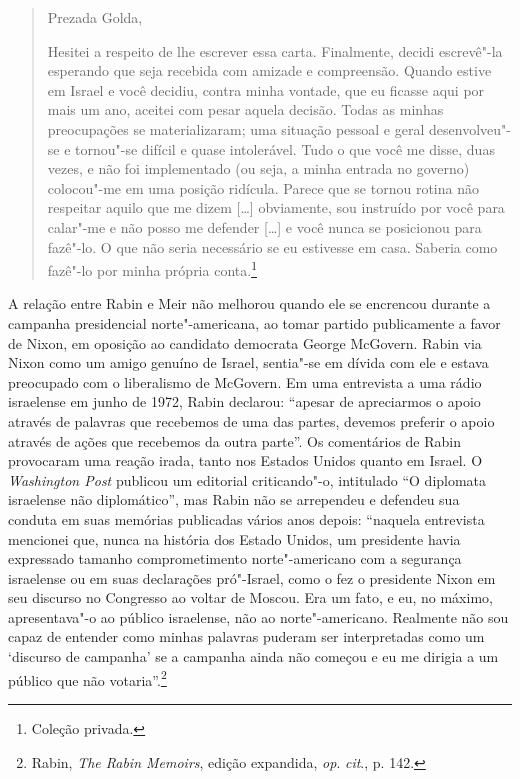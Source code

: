 \begin{quote}
Prezada Golda,

Hesitei a respeito de lhe escrever essa carta. Finalmente, decidi
escrevê"-la esperando que seja recebida com amizade e compreensão. Quando
estive em Israel e você decidiu, contra minha vontade, que eu ficasse
aqui por mais um ano, aceitei com pesar aquela decisão. Todas as minhas
preocupações se materializaram; uma situação pessoal e geral
desenvolveu"-se e tornou"-se difícil e quase intolerável. Tudo o que você
me disse, duas vezes, e não foi implementado (ou seja, a minha entrada
no governo) colocou"-me em uma posição ridícula. Parece que se tornou
rotina não respeitar aquilo que me dizem {[}\ldots{}{]} obviamente, sou instruído por
você para calar"-me e não posso me defender {[}\ldots{}{]} e você nunca se posicionou
para fazê"-lo. O que não seria necessário se eu estivesse em casa. Saberia como
fazê"-lo por minha própria conta.\footnote{Coleção privada.}
\end{quote}

A relação entre Rabin e Meir não melhorou quando ele se encrencou
durante a campanha presidencial norte"-americana, ao tomar partido
publicamente a favor de Nixon, em oposição ao candidato democrata George
McGovern. Rabin via Nixon como um amigo genuíno de Israel, sentia"-se em
dívida com ele e estava preocupado com o liberalismo de McGovern. Em uma
entrevista a uma rádio israelense em junho de 1972, Rabin declarou:
``apesar de apreciarmos o apoio através de palavras que recebemos de uma
das partes, devemos preferir o apoio através de ações que recebemos da
outra parte''. Os comentários de Rabin provocaram uma reação irada,
tanto nos Estados Unidos quanto em Israel. O \textit{Washington Post}
publicou um editorial criticando"-o, intitulado ``O diplomata israelense
não diplomático'', mas Rabin não se arrependeu e defendeu sua conduta em
suas memórias publicadas vários anos depois: ``naquela entrevista
mencionei que, nunca na história dos Estado Unidos, um presidente havia
expressado tamanho comprometimento norte"-americano com a segurança
israelense ou em suas declarações pró"-Israel, como o fez o presidente
Nixon em seu discurso no Congresso ao voltar de Moscou. Era um fato, e
eu, no máximo, apresentava"-o ao público israelense, não ao
norte"-americano. Realmente não sou capaz de entender como minhas
palavras puderam ser interpretadas como um `discurso de campanha' se a
campanha ainda não começou e eu me dirigia a um público que não
votaria''.\footnote{Rabin, \textit{The Rabin Memoirs}, edição expandida, \textit{op}. 
\textit{cit}., p. 142.}

